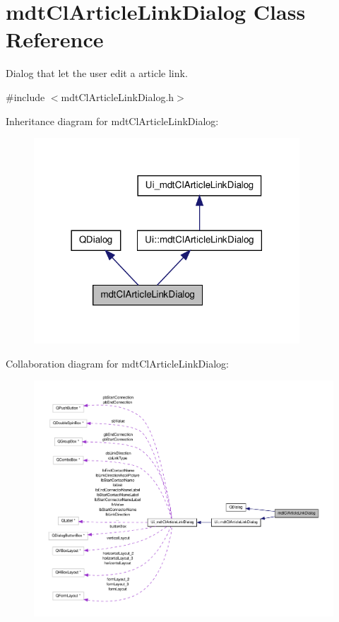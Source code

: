 \hypertarget{classmdt_cl_article_link_dialog}{\section{mdt\-Cl\-Article\-Link\-Dialog Class Reference}
\label{classmdt_cl_article_link_dialog}
}


Dialog that let the user edit a article link.  




{\ttfamily \#include $<$mdt\-Cl\-Article\-Link\-Dialog.\-h$>$}



Inheritance diagram for mdt\-Cl\-Article\-Link\-Dialog\-:
\nopagebreak
\begin{figure}[H]
\begin{center}
\leavevmode
\includegraphics[width=282pt]{classmdt_cl_article_link_dialog__inherit__graph}
\end{center}
\end{figure}


Collaboration diagram for mdt\-Cl\-Article\-Link\-Dialog\-:
\nopagebreak
\begin{figure}[H]
\begin{center}
\leavevmode
\includegraphics[width=350pt]{classmdt_cl_article_link_dialog__coll__graph}
\end{center}
\end{figure}
